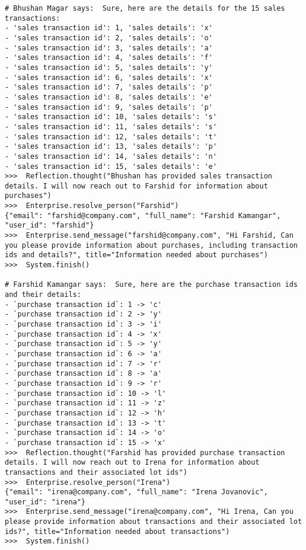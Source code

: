 \begin{lstlisting}
# Bhushan Magar says:  Sure, here are the details for the 15 sales transactions: 
- 'sales transaction id': 1, 'sales details': 'x'
- 'sales transaction id': 2, 'sales details': 'o'
- 'sales transaction id': 3, 'sales details': 'a'
- 'sales transaction id': 4, 'sales details': 'f'
- 'sales transaction id': 5, 'sales details': 'y'
- 'sales transaction id': 6, 'sales details': 'x'
- 'sales transaction id': 7, 'sales details': 'p'
- 'sales transaction id': 8, 'sales details': 'e'
- 'sales transaction id': 9, 'sales details': 'p'
- 'sales transaction id': 10, 'sales details': 's'
- 'sales transaction id': 11, 'sales details': 's'
- 'sales transaction id': 12, 'sales details': 't'
- 'sales transaction id': 13, 'sales details': 'p'
- 'sales transaction id': 14, 'sales details': 'n'
- 'sales transaction id': 15, 'sales details': 'e' 
>>>  Reflection.thought("Bhushan has provided sales transaction details. I will now reach out to Farshid for information about purchases")
>>>  Enterprise.resolve_person("Farshid")
{"email": "farshid@company.com", "full_name": "Farshid Kamangar", "user_id": "farshid"}
>>>  Enterprise.send_message("farshid@company.com", "Hi Farshid, Can you please provide information about purchases, including transaction ids and details?", title="Information needed about purchases")
>>>  System.finish()

# Farshid Kamangar says:  Sure, here are the purchase transaction ids and their details:
- `purchase transaction id`: 1 -> 'c'
- `purchase transaction id`: 2 -> 'y'
- `purchase transaction id`: 3 -> 'i'
- `purchase transaction id`: 4 -> 'x'
- `purchase transaction id`: 5 -> 'y'
- `purchase transaction id`: 6 -> 'a'
- `purchase transaction id`: 7 -> 'r'
- `purchase transaction id`: 8 -> 'a'
- `purchase transaction id`: 9 -> 'r'
- `purchase transaction id`: 10 -> 'l'
- `purchase transaction id`: 11 -> 'z'
- `purchase transaction id`: 12 -> 'h'
- `purchase transaction id`: 13 -> 't'
- `purchase transaction id`: 14 -> 'o'
- `purchase transaction id`: 15 -> 'x' 
>>>  Reflection.thought("Farshid has provided purchase transaction details. I will now reach out to Irena for information about transactions and their associated lot ids")
>>>  Enterprise.resolve_person("Irena")
{"email": "irena@company.com", "full_name": "Irena Jovanovic", "user_id": "irena"}
>>>  Enterprise.send_message("irena@company.com", "Hi Irena, Can you please provide information about transactions and their associated lot ids?", title="Information needed about transactions")
>>>  System.finish()


\end{lstlisting}
